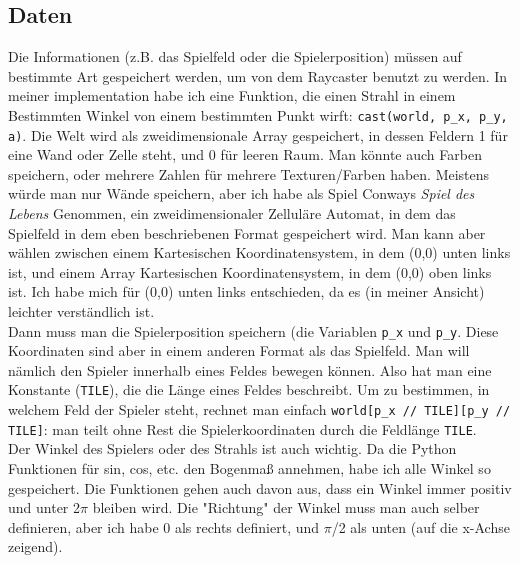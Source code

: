 \documentclass[a4paper,11pt]{report}
\begin{document}
\subsection{Daten}
Die Informationen (z.B. das Spielfeld oder die Spielerposition) müssen auf bestimmte Art gespeichert werden, um von dem Raycaster benutzt zu werden. In meiner implementation habe ich eine Funktion, die einen Strahl in einem Bestimmten Winkel von einem bestimmten Punkt wirft: \texttt{cast(world, p\_x, p\_y, a)}. Die Welt wird als zweidimensionale Array gespeichert, in dessen Feldern 1 für eine Wand oder Zelle steht, und 0 für leeren Raum. Man könnte auch Farben speichern, oder mehrere Zahlen für mehrere Texturen/Farben haben. Meistens würde man nur Wände speichern, aber ich habe als Spiel Conways \textit{Spiel des Lebens} Genommen, ein zweidimensionaler Zelluläre Automat, in dem das Spielfeld in dem eben beschriebenen Format gespeichert wird. Man kann aber wählen zwischen einem Kartesischen Koordinatensystem, in dem (0,0) unten links ist, und einem Array Kartesischen Koordinatensystem, in dem (0,0) oben links ist. Ich habe mich für (0,0) unten links entschieden, da es (in meiner Ansicht) leichter verständlich ist. \\
Dann muss man die Spielerposition speichern (die Variablen \texttt{p\_x} und \texttt{p\_y}. Diese Koordinaten sind aber in einem anderen Format als das Spielfeld. Man will nämlich den Spieler innerhalb eines Feldes bewegen können. Also hat man eine Konstante (\texttt{TILE}), die die Länge eines Feldes beschreibt. Um zu bestimmen, in welchem Feld der Spieler steht, rechnet man einfach \texttt{world[p\_x // TILE][p\_y // TILE]}: man teilt ohne Rest die Spielerkoordinaten durch die Feldlänge \texttt{TILE}. \\
Der Winkel des Spielers oder des Strahls ist auch wichtig. Da die Python Funktionen für sin, cos, etc. den Bogenmaß annehmen, habe ich alle Winkel so gespeichert. Die Funktionen gehen auch davon aus, dass ein Winkel immer positiv und unter 2$\pi$ bleiben wird. Die "Richtung" der Winkel muss man auch selber definieren, aber ich habe 0 als rechts definiert, und $\pi$/2 als unten (auf die x-Achse zeigend).
\end{document}
